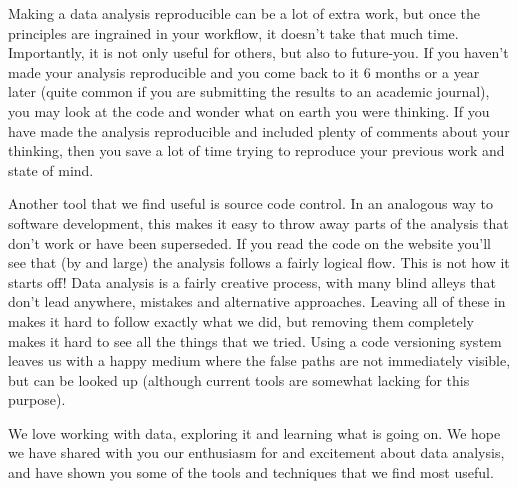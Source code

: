 \documentclass[oneside]{article}
\begin{document}
Making a data analysis reproducible can be a lot of extra work, but once the principles are ingrained in your workflow, it doesn't take that much time.  Importantly, it is not only useful for others, but also to future-you.  If you haven't made your analysis reproducible and you come back to it 6 months or a year later (quite common if you are submitting the results to an academic journal), you may look at the code and wonder what on earth you were thinking.  If you have made the analysis reproducible and included plenty of comments about your thinking, then you save a lot of time trying to reproduce your previous work and state of mind.

Another tool that we find useful is source code control.  In an analogous way to software development, this makes it easy to throw away parts of the analysis that don't work or have been superseded.  If you read the code on the website you'll see that (by and large) the analysis follows a fairly logical flow.  This is not how it starts off!  Data analysis is a fairly creative process, with many blind alleys that don't lead anywhere, mistakes and alternative approaches.  Leaving all of these in makes it hard to follow exactly what we did, but removing them completely makes it hard to see all the things that we tried.  Using a code versioning system leaves us with a happy medium where the false paths are not immediately visible, but can be looked up (although current tools are somewhat lacking for this purpose).

We love working with data, exploring it and learning what is going on.  We hope we have shared with you our enthusiasm for and excitement about data analysis, and have shown you some of the tools and techniques that we find most useful.  








\end{document}
